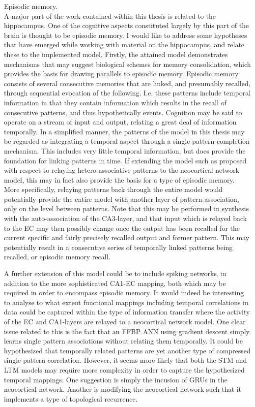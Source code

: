 Episodic memory.
\\

A major part of the work contained within this thesis is related to the hippocampus. One of the cognitive aspects constituted largely by this part of the brain is thought to be episodic memory. I would like to address some hypotheses that have emerged while working with material on the hippocampus, and relate these to the implemented model.
Firstly, the attained model demonstrates mechanisms that may suggest biological schemes for memory consolidation, which provides the basis for drawing parallels to episodic memory. Episodic memory consists of several consecutive memories that are linked, and presumably recalled, through sequential evocation of the following. I.e. these patterns include temporal information in that they contain information which results in the recall of consecutive patterns, and thus hypothetically events.
Cognition may be said to operate on a stream of input and output, relating a great deal of information temporally. 
In a simplified manner, the patterns of the model in this thesis may be regarded as integrating a temporal aspect through a single pattern-completion mechanism. This includes very little temporal information, but does provide the foundation for linking patterns in time. 
If extending the model such as proposed with respect to relaying hetero-associative patterns to the neocortical network model, this may in fact also provide the basis for a type of episodic memory.
More specifically, relaying patterns back through the entire model would potentially provide the entire model with another layer of pattern-association, only on the level between patterns. Note that this may be performed in synthesis with the auto-association of the CA3-layer, and that input which is relayed back to the EC may then possibly change once the output has been recalled for the current specific and fairly precisely recalled output and former pattern. This may potentially result in a consecutive series of temporally linked patterns being recalled, or episodic memory recall.

A further extension of this model could be to include spiking networks, in addition to the more sophisticated CA1-EC mapping, both which may be required in order to encompass episodic memory. 
It would indeed be interesting to analyse to what extent functional mappings including temporal correlations in data could be captured within the type of information transfer where the activity of the EC and CA1-layers are relayed to a neocortical network model. 
One clear issue related to this is the fact that an FFBP ANN using gradient descent simply learns single pattern associations without relating them temporally.
It could be hypothesized that temporally related patterns are yet another type of compressed single pattern correlation. However, it seems more likely that both the STM and LTM models may require more complexity in order to capture the hypothesized temporal mappings. One suggestion is simply the incusion of GRUs in the neocortical network. Another is modifying the neocortical network such that it implements a type of topological recurrence.

